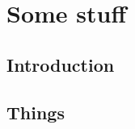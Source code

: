 \chapter{Some stuff}

\section{Introduction}

\blindtext[10]

\cite{hawking1974black}

\section{Things}
